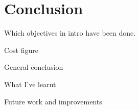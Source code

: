 

\section{Conclusion}

Which objectives in intro have been done. 

Cost figure

General conclusion 

What I've learnt

Future work and improvements

